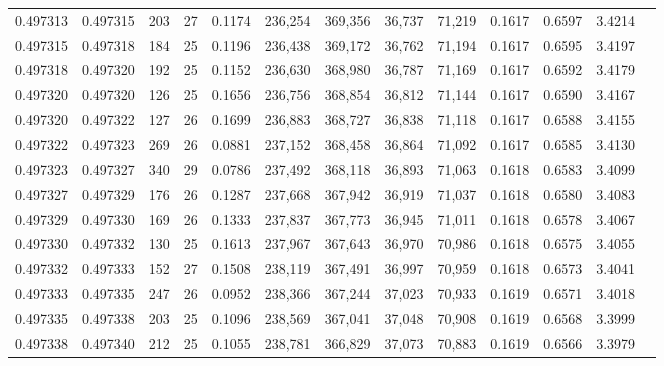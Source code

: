 \begin{tabular}{rrrrrrrrrrrrr}
0.497313 & 0.497315 & 203 &  27 &                                     0.1174 & 236,254 & 369,356 &  36,737 &  71,219 & 0.1617 & 0.6597 & 3.4214 \\
0.497315 & 0.497318 & 184 &  25 &                                     0.1196 & 236,438 & 369,172 &  36,762 &  71,194 & 0.1617 & 0.6595 & 3.4197 \\
0.497318 & 0.497320 & 192 &  25 &                                     0.1152 & 236,630 & 368,980 &  36,787 &  71,169 & 0.1617 & 0.6592 & 3.4179 \\
0.497320 & 0.497320 & 126 &  25 &                                     0.1656 & 236,756 & 368,854 &  36,812 &  71,144 & 0.1617 & 0.6590 & 3.4167 \\
0.497320 & 0.497322 & 127 &  26 &                                     0.1699 & 236,883 & 368,727 &  36,838 &  71,118 & 0.1617 & 0.6588 & 3.4155 \\
0.497322 & 0.497323 & 269 &  26 &                                     0.0881 & 237,152 & 368,458 &  36,864 &  71,092 & 0.1617 & 0.6585 & 3.4130 \\
0.497323 & 0.497327 & 340 &  29 &                                     0.0786 & 237,492 & 368,118 &  36,893 &  71,063 & 0.1618 & 0.6583 & 3.4099 \\
0.497327 & 0.497329 & 176 &  26 &                                     0.1287 & 237,668 & 367,942 &  36,919 &  71,037 & 0.1618 & 0.6580 & 3.4083 \\
0.497329 & 0.497330 & 169 &  26 &                                     0.1333 & 237,837 & 367,773 &  36,945 &  71,011 & 0.1618 & 0.6578 & 3.4067 \\
0.497330 & 0.497332 & 130 &  25 &                                     0.1613 & 237,967 & 367,643 &  36,970 &  70,986 & 0.1618 & 0.6575 & 3.4055 \\
0.497332 & 0.497333 & 152 &  27 &                                     0.1508 & 238,119 & 367,491 &  36,997 &  70,959 & 0.1618 & 0.6573 & 3.4041 \\
0.497333 & 0.497335 & 247 &  26 &                                     0.0952 & 238,366 & 367,244 &  37,023 &  70,933 & 0.1619 & 0.6571 & 3.4018 \\
0.497335 & 0.497338 & 203 &  25 &                                     0.1096 & 238,569 & 367,041 &  37,048 &  70,908 & 0.1619 & 0.6568 & 3.3999 \\
0.497338 & 0.497340 & 212 &  25 &                                     0.1055 & 238,781 & 366,829 &  37,073 &  70,883 & 0.1619 & 0.6566 & 3.3979 \\

\end{tabular}
